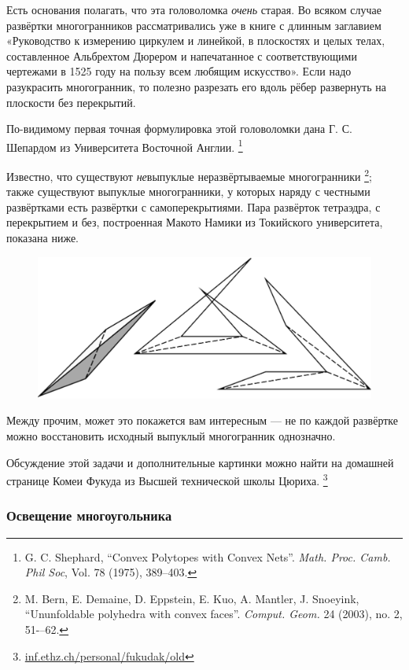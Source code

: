 Есть основания полагать, что эта головоломка \emph{очень} старая. 
Во всяком случае развёртки многогранников рассматривались уже в книге с длинным заглавием «Руководство к измерению циркулем и линейкой, в плоскостях и целых телах, составленное Альбрехтом Дюрером и напечатанное с соответствующими чертежами в 1525 году на пользу всем любящим искусство».
Если надо разукрасить многогранник, то полезно разрезать его вдоль рёбер развернуть на плоскости без перекрытий.

По-видимому первая точная формулировка этой головоломки дана Г. С. Шепардом из Университета Восточной Англии.%
\footnote{G. C. Shephard, ``Convex Polytopes with Convex Nets''. \emph{Math. Proc. Camb. Phil Soc}, Vol. 78 (1975), 389--403.}
 
Известно, что существуют \emph{не}выпуклые неразвёртываемые многогранники%
\footnote{M. Bern, E. Demaine, D. Eppstein, E. Kuo, A. Mantler, J. Snoeyink, 
``Ununfoldable polyhedra with convex faces''.
\emph{Comput. Geom.} 24 (2003), no. 2, 51-–62.};
также существуют выпуклые многогранники, у которых наряду с честными развёртками есть развёртки с самоперекрытиями. 
Пара развёрток тетраэдра, с перекрытием и без, построенная Макото Намики из Токийского университета, показана ниже.

\begin{figure}[h!]
\centering
\includegraphics[scale=0.5]{Figs/UnsolvedPuzzles/unfold}
\end{figure}

Между прочим, может это покажется вам интересным --- не по каждой развёртке можно восстановить исходный выпуклый многогранник однозначно. %

Обсуждение этой задачи и дополнительные картинки можно найти на домашней странице Комеи Фукуда из Высшей технической школы Цюриха.%
\footnote{\href{https://inf.ethz.ch/personal/fukudak/old/}{\url{inf.ethz.ch/personal/fukudak/old}}}

\subsubsection*{Освещение многоугольника}

